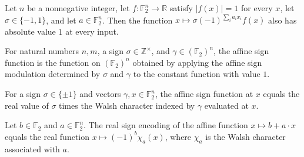 \begin{theorem}
\label{FABL.IsSignValued.affineModulation}
\leanok
{}
Let $n$ be a nonnegative integer, let $f:\mathbb F_2^n\to\mathbb R$ satisfy
$|f(x)|=1$ for every $x$, let $\sigma\in\{-1,1\}$, and let $a\in\mathbb F_2^n$.
Then the function $x\mapsto\sigma(-1)^{\sum_i a_i x_i}f(x)$ also has absolute value
$1$ at every input.
\end{theorem}

\begin{definition}
\label{FABL.affineSignFunction}
\leanok
{}
For natural numbers $n,m$, a sign $\sigma\in\mathbb Z^\times$, and $\gamma\in(\mathbb
F_2)^n$, the affine sign function is the function on $(\mathbb F_2)^n$ obtained by
applying the affine sign modulation determined by $\sigma$ and $\gamma$ to the constant
function with value $1$.
\end{definition}

\begin{theorem}
\label{FABL.affineSignFunction_apply}
\leanok
{}
For a sign $\sigma\in\{\pm1\}$ and vectors $\gamma,x\in\mathbb F_2^n$, the affine sign
function at $x$ equals the real value of $\sigma$ times the Walsh character indexed by
$\gamma$ evaluated at $x$.
\end{theorem}

\begin{theorem}
\label{FABL.realSignEncodedFunction_affineFunction}
\leanok
{}
Let $b\in\mathbb F_2$ and $a\in\mathbb F_2^n$. The real sign encoding of the affine
function $x\mapsto b+a\cdot x$ equals the real function $x\mapsto (-1)^b\chi_a(x)$,
where $\chi_a$ is the Walsh character associated with $a$.
\end{theorem}

